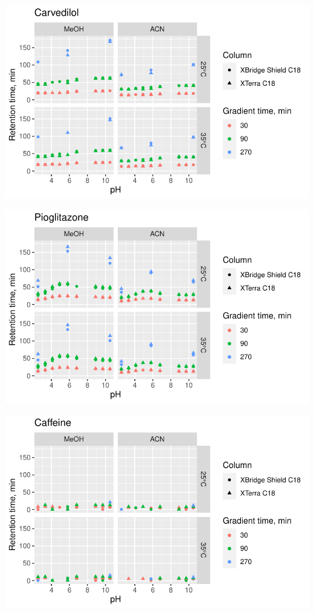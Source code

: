 \documentclass[
  letterpaper,
  DIV=11,
  numbers=noendperiod]{scrreprt}
\begin{document}
\includegraphics{index_files/figure-pdf/unnamed-chunk-4-42.pdf}

\includegraphics{index_files/figure-pdf/unnamed-chunk-4-43.pdf}

\includegraphics{index_files/figure-pdf/unnamed-chunk-4-44.pdf}
\end{document}
